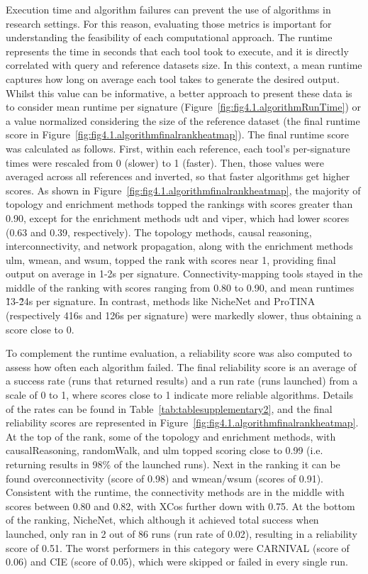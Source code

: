 Execution time and algorithm failures can prevent the use of algorithms in research settings.
For this reason, evaluating those metrics is important for understanding the feasibility of each computational approach.
The runtime represents the time in seconds that each tool took to execute, and it is directly correlated with query and reference datasets size.
In this context, a mean runtime captures how long on average each tool takes to generate the desired output.
Whilst this value can be informative, a better approach to present these data is to consider mean runtime per signature (Figure~\ref{fig:fig4.1.algorithmRunTime}) or a value normalized considering the size of the reference dataset (the final runtime score in Figure~\ref{fig:fig4.1.algorithmfinalrankheatmap}).
The final runtime score was calculated as follows. First, within each reference, each tool's per-signature times were rescaled from 0 (slower) to 1 (faster).
Then, those values were averaged across all references and inverted, so that faster algorithms get higher scores. As shown in Figure~\ref{fig:fig4.1.algorithmfinalrankheatmap}, the majority of topology and enrichment methods topped the rankings with scores greater than 0.90, except for the enrichment methods udt and viper, which had lower scores (0.63 and 0.39, respectively).
The topology methods, causal reasoning, interconnectivity, and network propagation, along with the enrichment methods ulm, wmean, and wsum, topped the rank with scores near 1, providing final output on average in 1-2s per signature.
Connectivity-mapping tools stayed in the middle of the ranking with scores ranging from 0.80 to 0.90, and mean runtimes \~13-\~24s per signature.
In contrast, methods like NicheNet and \gls{ProTINA} (respectively 416s and 126s per signature) were markedly slower, thus obtaining a score close to 0.

To complement the runtime evaluation, a reliability score was also computed to assess how often each algorithm failed.
The final reliability score is an average of a success rate (runs that returned results) and a run rate (runs launched) from a scale of 0 to 1, where scores close to 1 indicate more reliable algorithms.
Details of the rates can be found in Table~\ref{tab:tablesupplementary2}, and the final reliability scores are represented in Figure~\ref{fig:fig4.1.algorithmfinalrankheatmap}.
At the top of the rank, some of the topology and enrichment methods, with causalReasoning, randomWalk, and ulm topped scoring close to 0.99 (i.e. returning results in 98\% of the launched runs).
Next in the ranking it can be found overconnectivity (score of 0.98) and wmean/wsum (scores of 0.91).
Consistent with the runtime, the connectivity methods are in the middle with scores between 0.80 and 0.82, with XCos further down with 0.75.
At the bottom of the ranking, NicheNet, which although it achieved total success when launched, only ran in 2 out of 86 runs (run rate of 0.02), resulting in a reliability score of 0.51.
The worst performers in this category were \gls{CARNIVAL} (score of 0.06) and \gls{CIE} (score of 0.05), which were skipped or failed in every single run. 

